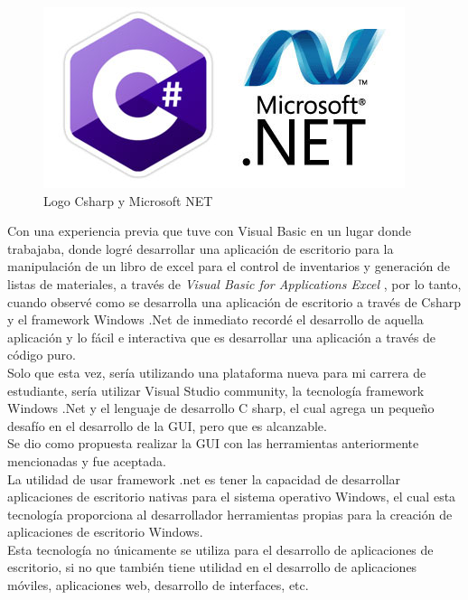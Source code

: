\documentclass[12pt,titlepage]{article}
\begin{document}
 \begin{figure}[htbp]
\hspace*{5.2cm} 
\includegraphics[scale=0.45]{logo_csharp}
\caption{Logo Csharp y Microsoft NET}
\end{figure}

Con una experiencia previa que tuve con Visual Basic en un lugar donde trabajaba, donde logré desarrollar una aplicación de escritorio para la manipulación de un libro de excel para el control de inventarios y generación de listas de materiales, a través de \textit{Visual Basic for Applications Excel }, por lo tanto, cuando observé como se desarrolla una aplicación de escritorio a través de Csharp y el framework Windows .Net de inmediato recordé el desarrollo de aquella aplicación y lo fácil e interactiva que es desarrollar una aplicación a través de código puro. \\

Solo que esta vez, sería utilizando una plataforma nueva para mi carrera de estudiante, sería utilizar Visual Studio community, la tecnología  framework Windows .Net y el lenguaje de desarrollo C sharp, el cual agrega un pequeño desafío en el desarrollo de la GUI, pero que es alcanzable. \\ 

Se dio como propuesta realizar la GUI con las herramientas anteriormente mencionadas y fue aceptada. \\ 

La utilidad de usar framework .net es tener la capacidad de desarrollar aplicaciones de escritorio nativas para el sistema operativo Windows, el cual esta tecnología proporciona al desarrollador herramientas propias para la creación de aplicaciones de escritorio Windows. \\ 

Esta tecnología no únicamente se utiliza para el desarrollo de aplicaciones de escritorio, si no que también tiene utilidad en el desarrollo de aplicaciones móviles, aplicaciones web, desarrollo de interfaces, etc. \\
\end{document}

